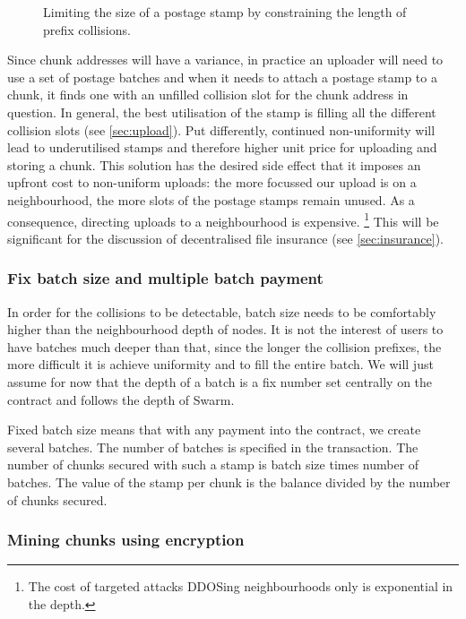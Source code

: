 \begin{figure}[htbp]
  \centering
  \caption[Limiting the size of a postage stamp]{Limiting the size of a postage stamp by constraining the length of prefix collisions.}
  \label{fig:prefix-collision}
\end{figure}


Since chunk addresses will have a variance, in practice an uploader will need to use a set of postage batches and when it needs to attach a postage stamp to a chunk, it finds one with an unfilled collision slot for the chunk address in question.  In general, the best utilisation of the stamp is filling all the different collision slots (see \ref{sec:upload}). Put differently, continued non-uniformity will lead to underutilised stamps and therefore higher unit price for uploading and storing a chunk. This solution has the desired side effect that it imposes an upfront cost to non-uniform uploads: the more focussed our upload is on a neighbourhood, the more slots of the postage stamps remain unused. As a consequence, directing uploads to a neighbourhood is expensive.%
%
\footnote{The cost of targeted attacks DDOSing neighbourhoods only is exponential in the depth.}
%
This will be significant for the discussion of decentralised file insurance (see \ref{sec:insurance}).

\subsubsection{Fix batch size and multiple batch payment}

In order for the collisions to be detectable, batch size needs to be comfortably higher than the neighbourhood depth of nodes. It is not the interest of users to have batches much deeper than that, since the longer the collision prefixes, the more difficult it is achieve uniformity and to fill the entire batch. We will just assume for now that the depth of a batch is a fix number set centrally on the contract and follows the depth of Swarm. 

Fixed batch size means that with any payment into the contract, we create several batches. The number  of batches is specified in the transaction. The  number of chunks secured with such a stamp is batch size times number of batches. The value of the stamp per chunk is the balance divided by the number of chunks secured.

\subsubsection{Mining chunks using encryption}



